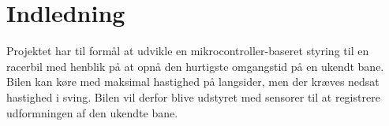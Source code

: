 \section{Indledning}

Projektet har til formål at udvikle en mikrocontroller-baseret styring til en racerbil med henblik på at opnå den hurtigste omgangstid på en ukendt bane.
Bilen kan køre med maksimal hastighed på langsider, men der kræves nedsat hastighed i sving.
Bilen vil derfor blive udstyret med sensorer til at registrere udformningen af den ukendte bane.
